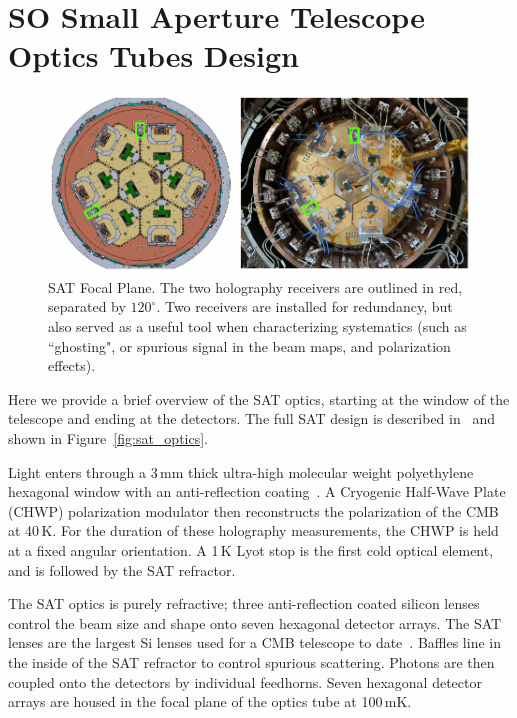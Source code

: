 \section{SO Small Aperture Telescope Optics Tubes Design}
\label{sec:sat_optics_tube}

\begin{figure}[t!]
    \centering
    \includegraphics[width = \textwidth]{Figures/sat_fpa.pdf}
    \caption{SAT Focal Plane.  The two holography receivers are outlined in red, separated by $120^{\circ}$.  Two receivers are installed for redundancy, but also served as a useful tool when characterizing systematics (such as ``ghosting", or spurious signal in the beam maps, and polarization effects).}
    \label{fig:sat_fpa}
\end{figure}

Here we provide a brief overview of the SAT optics, starting at the window of the telescope and ending at the detectors.  The full SAT design is described in~\cite{ali20,2020SPIE11445E7LK} and shown in Figure~\ref{fig:sat_optics}.


Light enters through a 3\,mm thick ultra-high molecular weight polyethylene hexagonal window with an anti-reflection coating~\cite{zhu18}.  A Cryogenic Half-Wave Plate (CHWP) polarization modulator then reconstructs the polarization of the CMB at 40\,K.  For the duration of these holography measurements, the CHWP is held at a fixed angular orientation.  A 1\,K Lyot stop is the first cold optical element, and is followed by the SAT refractor.

The SAT optics is purely refractive; three anti-reflection coated silicon lenses~\cite{Datta:13,golec20} control the beam size and shape onto seven hexagonal detector arrays.  The SAT lenses are the largest Si lenses used for a CMB telescope to date~\cite{ali20}.  Baffles line in the inside of the SAT refractor to control spurious scattering.  Photons are then coupled onto the detectors by individual feedhorns. Seven hexagonal detector arrays are housed in the focal plane of the optics tube at 100\,mK.

